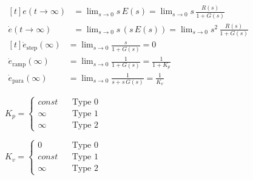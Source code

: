 \documentclass[multi={mymath,myarray},border=1pt]{standalone}
\newenvironment{mymath}{$\displaystyle}{$}
\newenvironment{myarray}{$\begin{aligned}[t]}{\end{aligned}$}
\begin{document}
\begin{myarray}
  e(t \rightarrow \infty) & = \lim_{s \rightarrow 0} s \, E(s) =
  \lim_{s \rightarrow 0} s \, \frac{R(s)}{1 + G(s)} \\
  \dot{e}(t \rightarrow \infty) & = \lim_{s \rightarrow 0} s \,(s \, E(s)) =
  \lim_{s \rightarrow 0} s^2 \, \frac{R(s)}{1 + G(s)} 
\end{myarray}
\begin{myarray}
  \dot{e}_{\text{step}}(\infty) & =  \lim_{s \rightarrow 0}  \frac{s}{1 + G(s)} =
  0 \\
  \dot{e}_{\text{ramp}}(\infty) & =  \lim_{s \rightarrow 0}  \frac{1}{1 + G(s)} =
  \frac{1}{1 + K_p}\\
  \dot{e}_{\text{para}}(\infty) & =  \lim_{s \rightarrow 0}  \frac{1}{s + s\,G(s)} =
  \frac{1}{K_v}
\end{myarray}

\begin{mymath}
  K_p = \left\{
  \begin{matrix}
    const & \:\:\:\:  \text{Type 0} \\
    \infty & \:\:\:\: \text{Type 1} \\
    \infty & \:\:\:\:  \text{Type 2}
  \end{matrix}
  \right.
\end{mymath}


\begin{mymath}
  K_v = \left\{
  \begin{matrix}
    0 & \:\:\:\:  \text{Type 0} \\
    const & \:\:\:\: \text{Type 1} \\
    \infty & \:\:\:\:  \text{Type 2}
  \end{matrix}
  \right.
\end{mymath}
\end{document}
